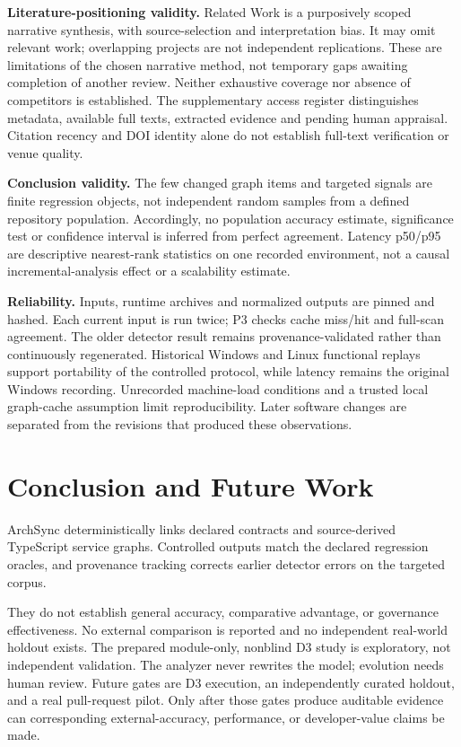 \documentclass[conference]{IEEEtran}
\begin{document}
\textbf{Literature-positioning validity.}
Related Work is a purposively scoped narrative synthesis, with source-selection and interpretation bias. It may omit relevant work; overlapping projects are not independent replications. These are limitations of the chosen narrative method, not temporary gaps awaiting completion of another review. Neither exhaustive coverage nor absence of competitors is established. The supplementary access register distinguishes metadata, available full texts, extracted evidence and pending human appraisal. Citation recency and DOI identity alone do not establish full-text verification or venue quality.

\textbf{Conclusion validity.}
The few changed graph items and targeted signals are finite regression objects, not independent random samples from a defined repository population. Accordingly, no population accuracy estimate, significance test or confidence interval is inferred from perfect agreement. Latency p50/p95 are descriptive nearest-rank statistics on one recorded environment, not a causal incremental-analysis effect or a scalability estimate.

\textbf{Reliability.}
Inputs, runtime archives and normalized outputs are pinned and hashed. Each current input is run twice; P3 checks cache miss/hit and full-scan agreement. The older detector result remains provenance-validated rather than continuously regenerated. Historical Windows and Linux functional replays support portability of the controlled protocol, while latency remains the original Windows recording. Unrecorded machine-load conditions and a trusted local graph-cache assumption limit reproducibility. Later software changes are separated from the revisions that produced these observations.

\section{Conclusion and Future Work}

ArchSync deterministically links declared contracts and source-derived TypeScript service graphs. Controlled outputs match the declared regression oracles, and provenance tracking corrects earlier detector errors on the targeted corpus.

They do not establish general accuracy, comparative advantage, or governance effectiveness. No external comparison is reported and no independent real-world holdout exists. The prepared module-only, nonblind D3 study is exploratory, not independent validation. The analyzer never rewrites the model; evolution needs human review. Future gates are D3 execution, an independently curated holdout, and a real pull-request pilot. Only after those gates produce auditable evidence can corresponding external-accuracy, performance, or developer-value claims be made.





\end{document}
